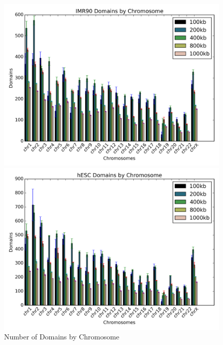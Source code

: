 \begin{figure}[thp]
  \caption{Number of Domains by Chromosome}
  \begin{minipage}{0.5\textwidth}%
    \centering
    \includegraphics[width=\textwidth]{./figures/results/domain_imr90_bar.png}
  \end{minipage}

  \begin{minipage}{0.5\textwidth}
    \centering
    \includegraphics[width=\textwidth]{./figures/results/domain_hesc_bar.png}
  \end{minipage}
\end{figure}

